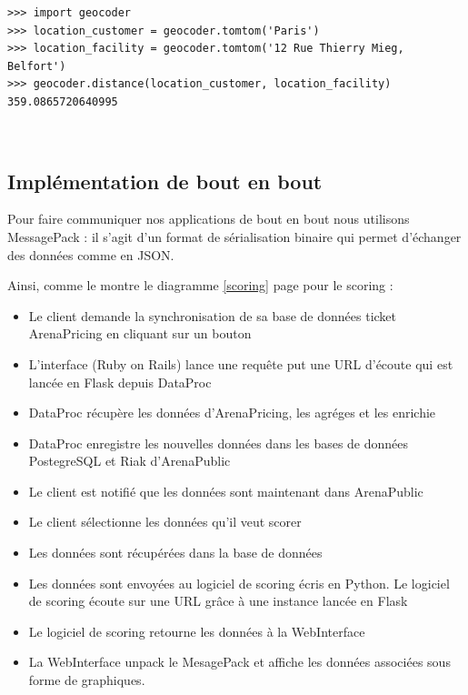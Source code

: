 \lstset{style=custompython}
\begin{lstlisting}
>>> import geocoder
>>> location_customer = geocoder.tomtom('Paris')
>>> location_facility = geocoder.tomtom('12 Rue Thierry Mieg, Belfort')
>>> geocoder.distance(location_customer, location_facility)
359.0865720640995
\end{lstlisting}
\leavevmode \\

\subsection{Implémentation de bout en bout}
Pour faire communiquer nos applications de bout en bout nous utilisons MessagePack : il s'agit d'un format de sérialisation binaire qui permet d'échanger des données comme en JSON.

Ainsi, comme le montre le diagramme \ref{scoring} page \pageref{scoring} pour le scoring : 

\begin{itemize}
  \item[\textbullet] Le client demande la synchronisation de sa base de données ticket ArenaPricing en cliquant sur un bouton
  \item[\textbullet] L'interface (Ruby on Rails) lance une requête put une URL d'écoute qui est lancée en Flask depuis DataProc
  \item[\textbullet] DataProc récupère les données d'ArenaPricing, les agréges et les enrichie
  \item[\textbullet] DataProc enregistre les nouvelles données dans les bases de données PostegreSQL et Riak d'ArenaPublic
  \item[\textbullet] Le client est notifié que les données sont maintenant dans ArenaPublic
  \item[\textbullet] Le client sélectionne les données qu'il veut scorer
  \item[\textbullet] Les données sont récupérées dans la base de données
  \item[\textbullet] Les données sont envoyées au logiciel de scoring écris en Python. Le logiciel de scoring écoute sur une URL grâce à une instance lancée en Flask
  \item[\textbullet] Le logiciel de scoring retourne les données à la WebInterface
  \item[\textbullet] La WebInterface unpack le MesagePack et affiche les données associées sous forme de graphiques. 
 

\end{itemize} 

